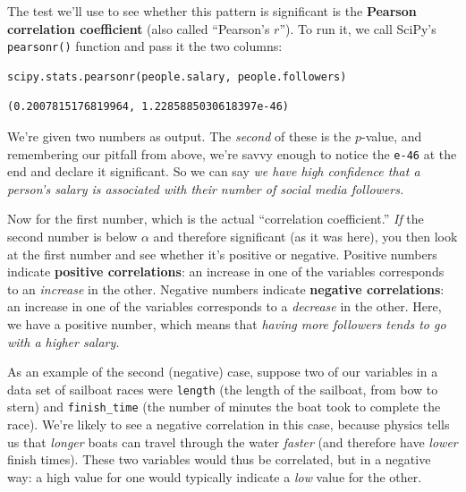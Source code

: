 The test we'll use to see whether this pattern is significant is the
\textbf{Pearson correlation coefficient} (also called ``Pearson's $r$''). To
run it, we call SciPy's \texttt{pearsonr()} function and pass it the two
columns:

\begin{Verbatim}[fontsize=\small,samepage=true,frame=single,framesep=3mm]
scipy.stats.pearsonr(people.salary, people.followers)
\end{Verbatim}
\vspace{-.2in}

\begin{Verbatim}[fontsize=\small,samepage=true,frame=leftline,framesep=5mm,framerule=1mm]
(0.2007815176819964, 1.2285885030618397e-46)
\end{Verbatim}

We're given two numbers as output. The \textit{second} of these is the
$p$-value, and remembering our pitfall from above, we're savvy enough to notice
the \texttt{e-46} at the end and declare it significant. So we can say
\textit{we have high confidence that a person's salary is associated with their
number of social media followers.}


Now for the first number, which is the actual ``correlation coefficient.''
\textit{If} the second number is below $\alpha$ and therefore significant (as
it was here), you then look at the first number and see whether it's positive
or negative. Positive numbers indicate \textbf{positive correlations}: an
increase in one of the variables corresponds to an \textit{increase} in the
other. Negative numbers indicate \textbf{negative correlations}: an increase in
one of the variables corresponds to a \textit{decrease} in the other. Here, we
have a positive number, which means that \textit{having more followers tends to
go with a higher salary.}

As an example of the second (negative) case, suppose two of our variables in a
data set of sailboat races were \texttt{length} (the length of the sailboat,
from bow to stern) and \texttt{finish\_time} (the number of minutes the boat
took to complete the race). We're likely to see a negative correlation in this
case, because physics tells us that \textit{longer} boats can travel through
the water \textit{faster} (and therefore have \textit{lower} finish times).
These two variables would thus be correlated, but in a negative way: a high
value for one would typically indicate a \textit{low} value for the other.
